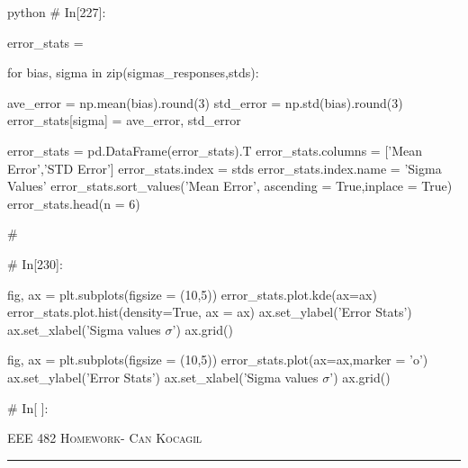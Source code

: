 \documentclass[12pt]{amsart}
\begin{document}
\begin{mintedbox}{python}
# In[227]:


error_stats = {}

for bias, sigma in zip(sigmas_responses,stds):
  
    ave_error = np.mean(bias).round(3)
    std_error = np.std(bias).round(3)
    error_stats[sigma] = ave_error, std_error
        
error_stats = pd.DataFrame(error_stats).T
error_stats.columns = ['Mean Error','STD Error']
error_stats.index = stds
error_stats.index.name = 'Sigma Values'
error_stats.sort_values('Mean Error', ascending = True,inplace = True)
error_stats.head(n = 6)


# 

# In[230]:


fig, ax = plt.subplots(figsize = (10,5))
error_stats.plot.kde(ax=ax)
error_stats.plot.hist(density=True, ax = ax)
ax.set_ylabel('Error Stats')
ax.set_xlabel('Sigma values $\sigma$')
ax.grid()


fig, ax = plt.subplots(figsize = (10,5))
error_stats.plot(ax=ax,marker = 'o')
ax.set_ylabel('Error Stats')
ax.set_xlabel('Sigma values $\sigma$')
ax.grid()



# In[ ]:





\end{mintedbox}


\newpage
{\scshape EEE 482} \hfill {\scshape \large  Homework-\relax} \hfill {\scshape Can Kocagil}
\smallskip
\hrule
\vspace{2mm}

\printbibliography
\end{document}
